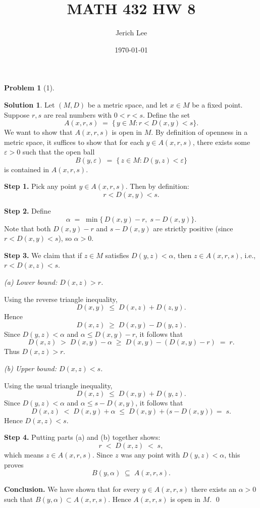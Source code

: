 \documentclass[12pt]{article}
\title{MATH 432 HW 8}
\author{Jerich Lee}
\date{\today}
\theoremstyle{definition} %
\newtheorem{solution}{Solution}
\newtheorem{problem}{Problem}
\theoremstyle{plain} %
\begin{document}
\maketitle

\begin{problem}[1]
    
\end{problem}
\begin{solution}
    Let $(M,D)$ be a metric space, and let $x\in M$ be a fixed point. Suppose $r,s$ are real numbers with $0 < r < s$. Define the set
\[
A(x,r,s) \;=\; \{\,y\in M : r < D(x,y) < s \}.
\]
We want to show that $A(x,r,s)$ is open in $M$. By definition of openness in a metric space, it suffices to show that for each $y\in A(x,r,s)$, there exists some $\varepsilon>0$ such that the open ball
\[
B(y,\varepsilon) \;=\; \{\, z \in M : D(y,z) < \varepsilon \}
\]
is contained in $A(x,r,s)$.

\medskip

\noindent \textbf{Step 1.} Pick any point $y\in A(x,r,s)$. Then by definition:
\[
r < D(x,y) < s.
\]

\noindent \textbf{Step 2.} Define
\[
\alpha \;=\; \min\bigl\{\,D(x,y) - r,\; s - D(x,y)\bigr\}.
\]
Note that both $D(x,y) - r$ and $s - D(x,y)$ are strictly positive (since $r < D(x,y) < s$), so $\alpha>0$.

\medskip

\noindent \textbf{Step 3.} We claim that if $z \in M$ satisfies $D(y,z) < \alpha$, then $z \in A(x,r,s)$, i.e., $r < D(x,z) < s$.

\smallskip

\noindent \emph{(a) Lower bound: $D(x,z) > r$.}

Using the reverse triangle inequality,
\[
D(x,y) \; \le\; D(x,z) + D(z,y).
\]
Hence
\[
D(x,z) \;\ge\; D(x,y) - D(y,z).
\]
Since $D(y,z) < \alpha$ and $\alpha \leq D(x,y) - r$, it follows that
\[
D(x,z) \;>\; D(x,y) - \alpha \;\ge\; D(x,y) - (D(x,y) - r) \;=\; r.
\]
Thus $D(x,z) > r$.

\smallskip

\noindent \emph{(b) Upper bound: $D(x,z) < s$.}

Using the usual triangle inequality,
\[
D(x,z) \;\le\; D(x,y) + D(y,z).
\]
Since $D(y,z) < \alpha$ and $\alpha \leq s - D(x,y)$, it follows that
\[
D(x,z) \;<\; D(x,y) + \alpha \;\le\; D(x,y) + \bigl(s - D(x,y)\bigr) \;=\; s.
\]
Hence $D(x,z) < s$.

\medskip

\noindent \textbf{Step 4.} Putting parts (a) and (b) together shows:
\[
r \;<\; D(x,z) \;<\; s,
\]
which means $z \in A(x,r,s)$. Since $z$ was any point with $D(y,z)<\alpha$, this proves
\[
B(y,\alpha) \;\subseteq\; A(x,r,s).
\]

\medskip

\noindent \textbf{Conclusion.} We have shown that for every $y \in A(x,r,s)$ there exists an $\alpha>0$ such that $B(y,\alpha) \subset A(x,r,s)$. Hence $A(x,r,s)$ is open in $M$. \qed
\end{solution}
\end{document}
